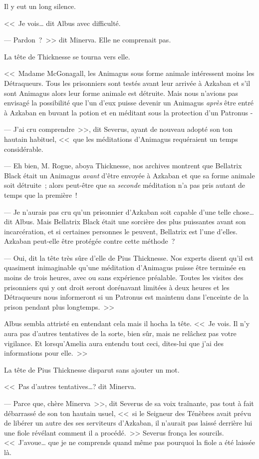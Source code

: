 Il y eut un long silence.

<<~Je vois… dit Albus avec difficulté.

--- Pardon~?~>> dit Minerva. Elle ne comprenait pas.

La tête de Thicknesse se tourna vers elle.

<<~Madame McGonagall, les Animagus sous forme animale intéressent moins les Détraqueurs. Tous les prisonniers sont testés avant leur arrivée à Azkaban et s'il sont Animagus alors leur forme animale est détruite. Mais nous n'avions pas envisagé la possibilité que l'un d'eux puisse devenir un Animagus \emph{après} être entré à Azkaban en buvant la potion et en méditant sous la protection d'un Patronus -

--- J'ai cru comprendre~>>, dit Severus, ayant de nouveau adopté son ton hautain habituel, <<~que les méditations d'Animagus requéraient un temps considérable.

--- Eh bien, M. Rogue, aboya Thicknesse, nos archives montrent que Bellatrix Black était un Animagus \emph{avant} d'être envoyée à Azkaban et que sa forme animale soit détruite~; alors peut-être que sa \emph{seconde} méditation n'a pas pris autant de temps que la première~!

--- Je n'aurais pas cru qu'un prisonnier d'Azkaban soit capable d'une telle chose… dit Albus. Mais Bellatrix Black était une sorcière des plus puissantes avant son incarcération, et si certaines personnes le peuvent, Bellatrix est l'une d'elles. Azkaban peut-elle être protégée contre cette méthode~?

--- Oui, dit la tête très sûre d'elle de Pius Thicknesse. Nos experts disent qu'il est quasiment inimaginable qu'une méditation d'Animagus puisse être terminée en moins de trois heures, avec ou sans expérience préalable. Toutes les visites des prisonniers qui y ont droit seront dorénavant limitées à deux heures et les Détraqueurs nous informeront si un Patronus est maintenu dans l'enceinte de la prison pendant plus longtemps.~>>

Albus sembla attristé en entendant cela mais il hocha la tête. <<~Je vois. Il n'y aura pas d'autres tentatives de la sorte, bien sûr, mais ne relâchez pas votre vigilance. Et lorsqu'Amelia aura entendu tout ceci, dites-lui que j'ai des informations pour elle.~>>

La tête de Pius Thicknesse disparut sans ajouter un mot.

<<~Pas d'autres tentatives…? dit Minerva.

--- Parce que, chère Minerva~>>, dit Severus de sa voix traînante, pas tout à fait débarrassé de son ton hautain usuel, <<~si le Seigneur des Ténèbres avait prévu de libérer un autre des ses serviteurs d'Azkaban, il n'aurait pas laissé derrière lui une fiole révélant comment il a procédé.~>> Severus fronça les sourcils. <<~J'avoue… que je ne comprends quand même pas pourquoi la fiole a été laissée là.

